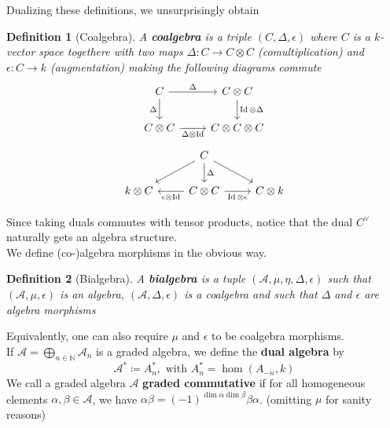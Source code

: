 \documentclass[11pt, a4paper]{article}
\DeclareMathOperator*{\id}{Id}
\newtheorem{defn}{Definition}
\theoremstyle{plain}
\begin{document}
Dualizing these definitions, we unsurprisingly obtain
\begin{defn}[Coalgebra]
	A \textbf{coalgebra} is a triple $( C,\Delta,\epsilon) $ where $C$ is a $k$-vector space togethere with two maps $\Delta\colon C \to C \otimes C$ (comultiplication) and $\epsilon\colon C \to k$ (augmentation) making the following diagrams commute
\[\begin{tikzcd}
	C & {C\otimes C} \\
	{C\otimes C} & {C\otimes C \otimes C}
	\arrow["\Delta", from=1-1, to=1-2]
	\arrow["{\id \otimes \Delta}", from=1-2, to=2-2]
	\arrow["{\Delta \otimes \id}"', from=2-1, to=2-2]
	\arrow["\Delta"', from=1-1, to=2-1]
\end{tikzcd}\]
\[\begin{tikzcd}
	& C \\
	{k\otimes C} & {C\otimes C} & {C\otimes k}
	\arrow["\Delta", from=1-2, to=2-2]
	\arrow[from=1-2, to=2-1]
	\arrow[from=1-2, to=2-3]
	\arrow["{\id \otimes \epsilon}"', from=2-2, to=2-3]
	\arrow["{\epsilon \otimes \id}", from=2-2, to=2-1]
\end{tikzcd}\]
\end{defn}
Since taking duals commutes with tensor products, notice that the dual  $C^{\vee}$ naturally gets an algebra structure.\\
We define (co-)algebra morphisms in the obvious way.
\begin{defn}[Bialgebra]
	A \textbf{bialgebra} is a tuple $( \mathcal{A}, \mu, \eta, \Delta, \epsilon) $ such that $( \mathcal{A}, \mu,\epsilon)$ is an algebra, $( \mathcal{A}, \Delta, \epsilon) $ is a coalgebra and such that $\Delta$ and $\epsilon$ are algebra morphisms
\end{defn}
Equivalently, one can also require $\mu$ and $\epsilon$ to be coalgebra morphisms.\\
If $\mathcal{A}= \bigoplus_{n \in \mathbb{N}}  \mathcal{A}_n$ is a graded algebra, we define the \textbf{dual algebra} by
\[ 
\mathcal{A}^{\ast} \coloneq A_n^{\ast}, \text{ with } A_n^{\ast}=\hom( A_{-n} , k) 
\]
We call a graded algebra $\mathcal{A}$ \textbf{graded commutative} if for all homogeneous elements $\alpha,\beta \in \mathcal{A}$, we have $\alpha \beta= (-1)^{\dim \alpha\dim\beta}\beta \alpha$. (omitting $\mu$ for sanity reasons)
\end{document}

